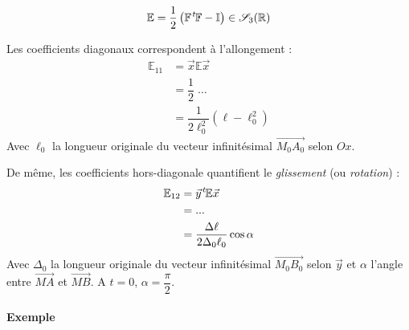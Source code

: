 \documentclass{article}
\newcommand{\transpose}{\hspace{.1em}{}^t\hspace{-.1em}}
\begin{document}
\[\mathbb{E} = \dfrac{1}{2} \left ( \mathbb{F} \transpose\mathbb{F} - \mathbb{I} \right ) \in \mathscr{S}_3(\mathbb{R})\]

Les coefficients diagonaux correspondent à l'allongement :
\begin{align*}
\mathbb{E}_{11} & = \vec{x}\mathbb{E}\vec{x}\\
& = \dfrac{1}{2} \; \hdots\\
& = \dfrac{1}{2\ell_0 ^2} \left ( \ell - \ell_0^2 \right )
\end{align*}
Avec $\ell_0$ la longueur originale du vecteur infinitésimal $\overrightarrow{M_0A_0}$ selon $Ox$.
\bigskip

De même, les coefficients hors-diagonale quantifient le \emph{glissement} (ou \emph{rotation}) :
\begin{align*}
\mathbb{E}_{12} & = \vec{y}\transpose \mathbb{E} \vec{x}\\
& = ... \\
& = \dfrac{\Delta \ell}{2 \Delta_0 \ell_0} \cos \alpha
\end{align*}
Avec $\Delta_0$ la longueur originale du vecteur infinitésimal $\overrightarrow{M_0B_0}$ selon $\vec{y}$ et $\alpha$ l'angle entre $\overrightarrow{MA}$ et $\overrightarrow{MB}$. A $t=0$, $\alpha = \dfrac{\pi}{2}$.

\paragraph{Exemple} 
\end{document}
